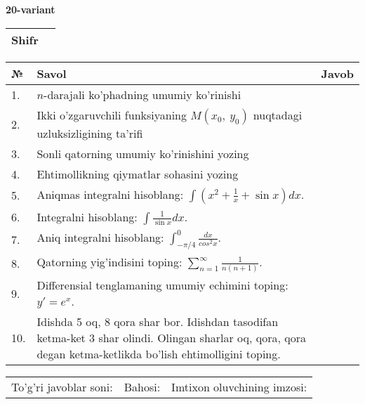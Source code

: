 \documentclass{article}
\begin{document}
  \egroup
  
  \newpage
  
  
  \textbf{20-variant}\\
  
  \bgroup
  \def\arraystretch{1.6} %
  
  \begin{tabular}{|m{5.7cm}|m{9.5cm}|}
  \hline
  Shifr & \\
  \hline
  \end{tabular}
  
  \vspace{1cm}
  
  \begin{tabular}{|m{0.7cm}|m{10cm}|m{4cm}|}
  \hline
  № & Savol & Javob \\
  \hline
  1. & \(n\)-darajali ko'phadning umumiy ko'rinishi &  \\
  \hline
  2. & Ikki o'zgaruvchili funksiyaning \(M(x_{0},\ y_{0})\) nuqtadagi uzluksizligining ta'rifi &  \\
  \hline
  3. & Sonli qatorning umumiy ko'rinishini yozing &  \\
  \hline
  4. & Ehtimollikning qiymatlar sohasini yozing &  \\
  \hline
  5. & Aniqmas integralni hisoblang: \(\int {\left( x^{2} + \frac{1}{x} + \sin x \right)dx}\). &  \\
  \hline
  6. & Integralni hisoblang: \(\int {\frac{1}{\sin x}dx}\). &  \\
  \hline
  7. & Aniq integralni hisoblang: \(\int_{- \pi/4}^{0}\frac{dx}{cos^{2}x}\). &  \\
  \hline
  8. & Qatorning yig'indisini toping: \(\sum_{n = 1}^{\infty}\frac{1}{n(n + 1)}\). &  \\
  \hline
  9. & Differensial tenglamaning umumiy echimini toping: \(y' = e^{x}\). &  \\
  \hline
  10. & Idishda 5 oq, 8 qora shar bor. Idishdan tasodifan ketma-ket 3 shar olindi. Olingan sharlar oq, qora, qora degan ketma-ketlikda bo'lish ehtimolligini toping. &  \\
  \hline
  \end{tabular}
  
  \vspace{1cm}
  
  \begin{tabular}{lll}
  To'g'ri javoblar soni: \underline{\hspace{1.5cm}} & 
  Bahosi: \underline{\hspace{1.5cm}} & 
  Imtixon oluvchining imzosi: \underline{\hspace{2cm}} \\
  \end{tabular}
  
\end{document}
